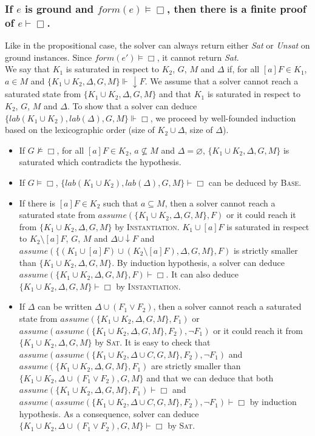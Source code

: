 \documentclass[a4paper,10pt]{report}
\newcommand{\F}{\mathit{form}}
\newcommand{\T}{\mathit{lab}}
\newcommand{\A}{\mathit{assume}}
\begin{document}
\subsubsection*{If $e$ is ground and $\F(e)\vDash\Box$, then there is a finite proof of $e\vdash\Box$.}
Like in the propositional case, the solver can always return either \emph{Sat} or \emph{Unsat} on
ground instances. Since $\F(e')\vDash\Box$, it cannot return \emph{Sat}.\\
We say that $K_1$ is saturated in respect to $K_2$, $G$, $M$ and $\Delta$ if, for all $[a]F\in K_1$,
$a\in M$ and $\{K_1\cup K_2,\Delta,G,M\}\Vdash\downarrow F$.
We assume that a solver cannot reach a saturated state from
$\{K_1\cup K_2,\Delta,G,M\}$ and that $K_1$ is saturated in respect to $K_2$, $G$, $M$ and $\Delta$.
To show that a solver can deduce $\{\T(K_1\cup K_2),\T(\Delta),G,M\}\Vdash\Box$,
we proceed by well-founded induction based on the lexicographic order (size of $K_2\cup\Delta$,
size of $\Delta$).
\begin{itemize}
 \item If $G\nvDash\Box$, for all $[a]F\in K_2$, $a\nsubseteq M$ and $\Delta=\varnothing$,
$\{K_1\cup K_2,\Delta,G,M\}$ is saturated which contradicts the hypothesis.
 \item If $G\vDash\Box$, $\{\T(K_1\cup K_2),\T(\Delta),G,M\}\vdash\Box$ can be deduced by \textsc{Base}.
 \item If there is $[a]F\in K_2$ such that $a\subseteq M$, then a solver
cannot reach a saturated state from $\A(\{K_1\cup K_2,\Delta,G,M\},F)$ or it could
reach it from $\{K_1\cup K_2,\Delta,G,M\}$ by \textsc{Instantiation}.
$K_1\cup [a]F$ is saturated in respect to $K_2\setminus[a]F$, $G$, $M$ and $\Delta\cup\downarrow F$
and $\A(\{(K_1\cup [a]F)\cup(K_2\setminus[a]F),\Delta,G,M\},F)$ is strictly smaller than
$\{K_1\cup K_2,\Delta,G,M\}$. By induction hypothesis,
a solver can deduce $\A(\{K_1\cup K_2,\Delta,G,M\},F)\vdash\Box$.
It can also deduce $\{K_1\cup K_2,\Delta,G,M\}\vdash\Box$ by \textsc{Instantiation}.
 \item If $\Delta$ can be written $\Delta\cup(F_1\vee F_2)$, then a solver
cannot reach a saturated state from $\A(\{K_1\cup K_2,\Delta,G,M\},F_1)$ or
$\A(\A(\{K_1\cup K_2,\Delta,G,M\},F_2),\neg F_1)$ or it could
reach it from $\{K_1\cup K_2,\Delta,G,M\}$ by \textsc{Sat}.
It is easy to check that $\A(\A(\{K_1\cup K_2,\Delta\cup C,G,M\},F_2),\neg F_1)$ and
$\A(\{K_1\cup K_2,\Delta,G,M\}, F_1)$ are strictly smaller than
$\{K_1\cup K_2,\Delta\cup (F_1\vee F_2),G,M\}$
and that we can deduce that both $\A(\{K_1\cup K_2,\Delta,G,M\}, F_1)\vdash\Box$ and
$\A(\A(\{K_1\cup K_2,\Delta\cup C,G,M\},F_2),\neg F_1)\vdash\Box$ by induction hypothesis.
As a consequence, solver can deduce $\{K_1\cup K_2,\Delta\cup(F_1\vee F_2),G,M\}\vdash\Box$ by \textsc{Sat}.
\end{itemize}
\end{document}
